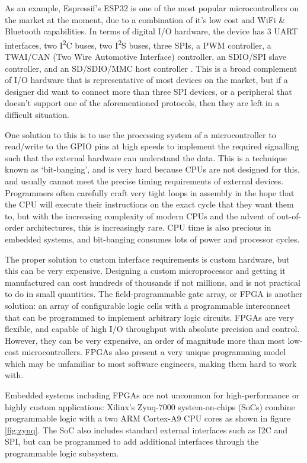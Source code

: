 As an example, Espressif's ESP32 is one of the most popular microcontrollers on the market at the moment, due to a combination of it's low cost and WiFi \& Bluetooth capabilities. In terms of digital I/O hardware, the device has 3 UART interfaces, two I\textsuperscript{2}C buses, two I\textsuperscript{2}S buses, three SPIs, a PWM controller, a TWAI/CAN (Two Wire Automotive Interface) controller, an SDIO/SPI slave controller, and an SD/SDIO/MMC host controller \cite{esp32}. This is a broad complement of I/O hardware that is representative of most devices on the market, but if a designer did want to connect more than three SPI devices, or a peripheral that doesn't support one of the aforementioned protocols, then they are left in a difficult situation.

One solution to this is to use the processing system of a microcontroller to read/write to the GPIO pins at high speeds to implement the required signalling such that the external hardware can understand the data. This is a technique known as `bit-banging', and is very hard because CPUs are not designed for this, and usually cannot meet the precise timing requirements of external devices. Programmers often carefully craft very tight loops in assembly in the hope that the CPU will execute their instructions on the exact cycle that they want them to, but with the increasing complexity of modern CPUs and the advent of out-of-order architectures, this is increasingly rare. CPU time is also precious in embedded systems, and bit-banging consumes lots of power and processor cycles.

The proper solution to custom interface requirements is custom hardware, but this can be very expensive. Designing a custom microprocessor and getting it manufactured can cost hundreds of thousands if not millions, and is not practical to do in small quantities. The field-programmable gate array, or FPGA is another solution: an array of configurable logic cells with a programmable interconnect that can be programmed to implement arbitrary logic circuits. FPGAs are very flexible, and capable of high I/O throughput with absolute precision and control. However, they can be very expensive, an order of magnitude more than most low-cost microcontrollers. FPGAs also present a very unique programming model which may be unfamiliar to most software engineers, making them hard to work with.

Embedded systems including FPGAs are not uncommon for high-performance or highly custom applications: Xilinx's Zynq-7000 system-on-chips (SoCs) combine programmable logic with a two ARM Cortex-A9 CPU cores as shown in figure \ref{fig:zynq}. The SoC also includes standard external interfaces such as I2C and SPI, but can be programmed to add additional interfaces through the programmable logic subsystem.

